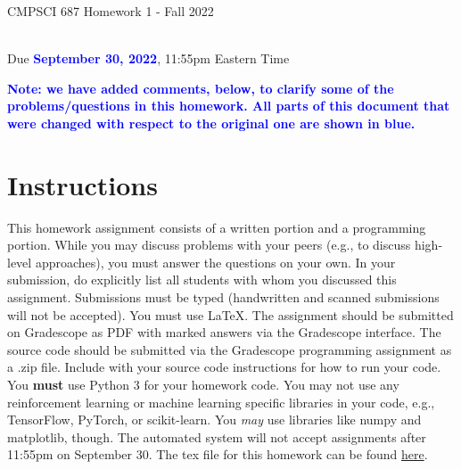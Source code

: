 \documentclass{article}
\newcommand{\TODO}[1]{\textcolor{blue}{\textbf{{#1}}}}
\begin{document}
\newpage
\begin{center}
    \begin{Large}
    CMPSCI 687 Homework 1 - Fall 2022 
    \end{Large}
    \\
    Due \TODO{September 30, 2022}, 11:55pm Eastern Time
\end{center}

\textcolor{blue}{\textbf{Note: we have added comments, below, to clarify some of the problems/questions in this homework. All parts of this document that were changed with respect to the original one are shown in blue.}}

\section{Instructions}

This homework assignment consists of a written portion and a programming portion. While you may discuss problems with your peers (e.g., to discuss high-level approaches), you must answer the questions on your own. In your submission, do explicitly list all students with whom you discussed this assignment. Submissions must be typed (handwritten and scanned submissions will not be accepted). You must use \LaTeX. The assignment should be submitted on Gradescope as PDF with marked answers via the Gradescope interface. The source code should be submitted via the Gradescope programming assignment as a .zip file. Include with your source code instructions for how to run your code. You \textbf{must} use Python 3 for your homework code. You may not use any reinforcement learning or machine learning specific libraries in your code, e.g., TensorFlow, PyTorch, or scikit-learn. You \textit{may} use libraries like numpy and matplotlib, though. The automated system will not accept assignments after 11:55pm on September 30. The tex file for this homework can be found \href{https://people.cs.umass.edu/~bsilva/courses/CMPSCI_687/Fall2022/HWs/HW1.zip}{here}. 
\end{document}
